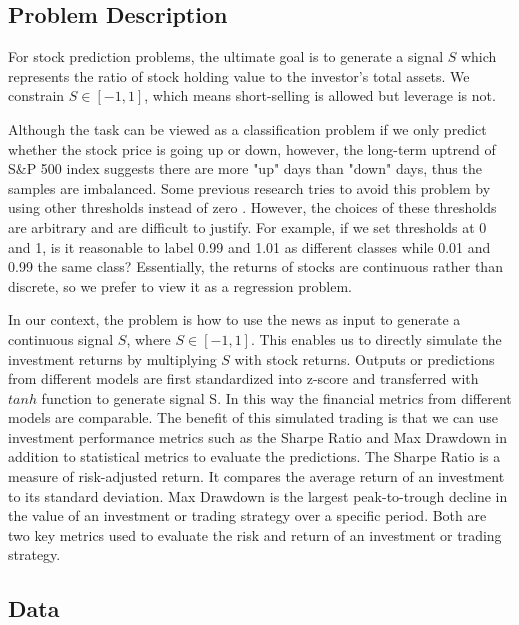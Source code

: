 \documentclass[11pt]{article}
\begin{document}
\subsection{Problem Description}

For stock prediction problems, the ultimate goal is to generate a signal $S$ which represents the ratio of stock holding value to the investor's total assets. We constrain $S \in [-1,1]$, which means short-selling is allowed but leverage is not.

Although the task can be viewed as a classification problem if we only predict whether the stock price is going up or down, however, the long-term uptrend of S\&P 500 index suggests there are more "up" days than "down" days, thus the samples are imbalanced. Some previous research tries to avoid this problem by using other thresholds instead of zero \citep{xu-cohen-2018-stock}. However, the choices of these thresholds are arbitrary and are difficult to justify. For example, if we set thresholds at 0 and 1, is it reasonable to label 0.99 and 1.01 as different classes while 0.01 and 0.99 the same class? Essentially, the returns of stocks are continuous rather than discrete, so we prefer to view it as a regression problem.

In our context, the problem is how to use the news as input to generate a continuous signal $S$, where $S \in [-1,1]$. This enables us to directly simulate the investment returns by multiplying $S$ with stock returns. Outputs or predictions from different models are first standardized into z-score and transferred with $tanh$ function to generate signal S. In this way the financial metrics from different models are comparable. The benefit of this simulated trading is that we can use investment performance metrics such as the Sharpe Ratio and Max Drawdown in addition to statistical metrics to evaluate the predictions. The Sharpe Ratio is a measure of risk-adjusted return. It compares the average return of an investment to its standard deviation. Max Drawdown is the largest peak-to-trough decline in the value of an investment or trading strategy over a specific period. Both are two key metrics used to evaluate the risk and return of an investment or trading strategy. 


\subsection{Data}
\end{document}
